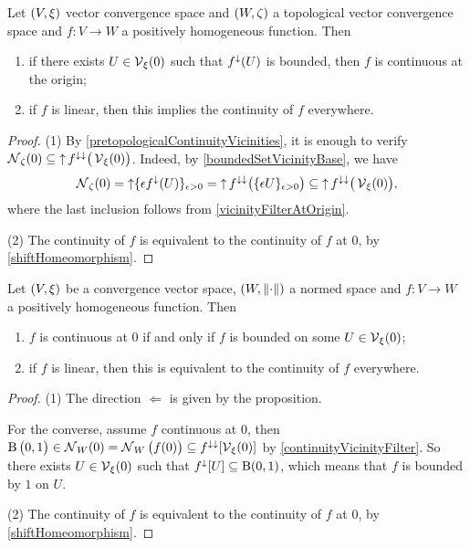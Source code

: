 \begin{proposition} \label{boundedOnVicinityImpliesContinuous}
Let $\sSet{V,\xi}$ vector convergence space and $\sSet{W,\zeta}$ a topological vector convergence space and $f: V\to W$ a positively homogeneous function. Then
\begin{enumerate}
\item if there exists $U\in \operatorname{\mathcal{V}}_\xi(0)$ such that $f^\downarrow(U)$ is bounded, then $f$ is continuous at the origin;
\item if $f$ is linear, then this implies the continuity of $f$ everywhere.
\end{enumerate}
\end{proposition}
\begin{proof}
(1) By \ref{pretopologicalContinuityVicinities}, it is enough to verify $\operatorname{\mathcal{N}}_\zeta(0) \subseteq \operatorname{\uparrow} f^{\downarrow\downarrow}\big(\operatorname{\mathcal{V}}_\xi(0)\big)$. Indeed, by \ref{boundedSetVicinityBase}, we have
\[ \operatorname{\mathcal{N}}_\zeta(0) = \operatorname{\uparrow} \{\epsilon f^\downarrow(U)\}_{\epsilon > 0} = \operatorname{\uparrow} f^{\downarrow\downarrow}\big(\{\epsilon U\}_{\epsilon > 0}\big) \subseteq \operatorname{\uparrow} f^{\downarrow\downarrow}\big(\operatorname{\mathcal{V}}_\xi(0)\big), \]
where the last inclusion follows from \ref{vicinityFilterAtOrigin}.

(2) The continuity of $f$ is equivalent to the continuity of $f$ at $0$, by \ref{shiftHomeomorphism}.
\end{proof}
\begin{corollary} \label{continuityToNormedSpace}
Let $\sSet{V, \xi}$ be a convergence vector space, $\sSet{W, \norm{\cdot}}$ a normed space and $f: V\to W$ a positively homogeneous function. Then
\begin{enumerate}
\item $f$ is continuous at $0$ \textup{if and only if} $f$ is bounded on some $U\in \operatorname{\mathcal{V}}_\xi(0)$;
\item if $f$ is linear, then this is equivalent to the continuity of $f$ everywhere.
\end{enumerate}
\end{corollary}
\begin{proof}
(1) The direction $\Leftarrow$ is given by the proposition.

For the converse, assume $f$ continuous at $0$, then $\operatorname{B}\big(0,1\big)\in \operatorname{\mathcal{N}}_W(0) = \operatorname{\mathcal{N}}_W\big(f(0)\big) \subseteq f^{\downarrow\downarrow}[\operatorname{\mathcal{V}}_\xi(0)]$ by \ref{continuityVicinityFilter}. So there exists $U\in \operatorname{\mathcal{V}}_\xi(0)$ such that $f^{\downarrow}[U] \subseteq \operatorname{B}(0,1)$, which means that $f$ is bounded by $1$ on $U$.

(2) The continuity of $f$ is equivalent to the continuity of $f$ at $0$, by \ref{shiftHomeomorphism}.
\end{proof}


